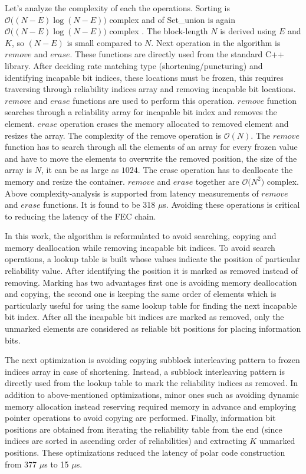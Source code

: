 Let's analyze the complexity of each the operations. Sorting is $\mathcal{O}\big((N-E)\log{}(N-E)\big)$ complex and of Set\_union is again $\mathcal{O}\big((N-E)\log{}(N-E)\big)$ complex \cite{cppStd}. The block-length $N$ is derived using $E$ and $K$, so $(N-E)$ is small compared to $N$. Next operation in the algorithm is $remove$ and $erase$. These functions are directly used from the standard C++ library. After deciding rate matching type (shortening/puncturing) and identifying incapable bit indices, these locations must be frozen, this requires traversing through reliability indices array and removing incapable bit locations. $remove$ and $erase$ functions are used to perform this operation. $remove$ function searches through a reliability array for incapable bit index and removes the element. $erase$ operation erases the memory allocated to removed element and resizes the array. The complexity of the remove operation is $\mathcal{O}(N)$. The $remove$ function has to search through all the elements of an array for every frozen value and have to move the elements to overwrite the removed position, the size of the array is $N$, it can be as large as $1024$. The erase operation has to deallocate the memory and resize the container. $remove$ and $erase$ together are $\mathcal{O}\big(N^2\big)$ complex. Above complexity-analysis is supported from latency measurements of $remove$ and $erase$ functions. It is found to be 318 $\mu$s. Avoiding these operations is critical to reducing the latency of the FEC chain. \newline

In this work, the algorithm is reformulated to avoid searching, copying and memory deallocation while removing incapable bit indices. To avoid search operations, a lookup table is built whose values indicate the position of particular reliability value. After identifying the position it is marked as removed instead of removing. Marking has two advantages first one is avoiding memory deallocation and copying, the second one is keeping the same order of elements which is particularly useful for using the same lookup table for finding the next incapable bit index. After all the incapable bit indices are marked as removed, only the unmarked elements are considered as reliable bit positions for placing information bits.


The next optimization is avoiding copying subblock interleaving pattern to frozen indices array in case of shortening. Instead, a subblock interleaving pattern is directly used from the lookup table to mark the reliability indices as removed. In addition to above-mentioned optimizations, minor ones such as avoiding dynamic memory allocation instead reserving required memory in advance and employing pointer operations to avoid copying are performed. Finally, information bit positions are obtained from iterating the reliability table from the end (since indices are sorted in ascending order of reliabilities) and extracting $K$ unmarked positions. These optimizations reduced the latency of polar code construction from 377 $\mu$s to 15 $\mu$s.

